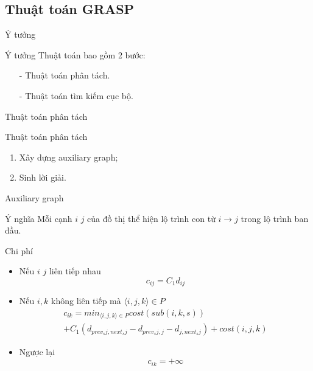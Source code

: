 \documentclass[compress]{beamer}
\begin{document}
\subsection{Thuật toán GRASP}
\begin{frame}{Ý tưởng}
\begin{block}{Ý tưởng}
Thuật toán bao gồm 2 bước: 
\begin{enumerate}
\item[-] Thuật toán phân tách.
\item[-] Thuật toán tìm kiếm cục bộ.
\end{enumerate}
\end{block}
\end{frame}
\begin{frame}{Thuật toán phân tách}
\begin{block}{Thuật toán phân tách}
\begin{enumerate}
\item Xây dựng auxiliary graph;
\item Sinh lời giải.
\end{enumerate}
\end{block}
\end{frame}
\begin{frame}{Auxiliary graph}
\begin{block}{Ý nghĩa}
Mỗi cạnh $i$ $j$ của đồ thị thể hiện lộ trình con từ $i\rightarrow j$ trong lộ trình ban đầu. 
\end{block}
\begin{block}{Chi phí}
\begin{itemize}
\item Nếu $i$ $j$ liên tiếp nhau 
$$c_{ij}=C_1d_{ij}$$
\item Nếu $i,k$ không liên tiếp mà  $\langle i,j,k \rangle \in P$
$$\begin{array}{l}
c_{ik}=min_{\langle i,j,k \rangle \in P} cost(sub(i,k,s))\\+C_1(d_{prev_sj,next_sj}-d_{prev_sj,j}-d_{j,next_sj})+cost(i,j,k)

\end{array}
$$
\item Ngược lại 
$$c_{ik}=+\infty$$
\end{itemize}
\end{block}
\end{frame}
\end{document}
